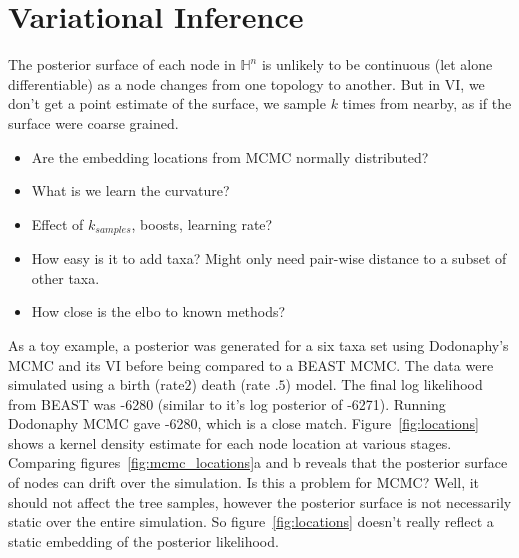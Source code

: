 \documentclass[11pt]{article}
\begin{document}
\section{Variational Inference}
The posterior surface of each node in $\mathbb{H}^{n}$ is unlikely to be continuous (let alone differentiable) as a node changes from one topology to another. But in VI, we don't get a point estimate of the surface, we sample $k$ times from nearby, as if the surface were coarse grained.

\begin{itemize}
\item Are the embedding locations from MCMC normally distributed?
\item What is we learn the curvature?
\item Effect of $k_{samples}$, boosts, learning rate?
\item How easy is it to add taxa? Might only need pair-wise distance to a subset of other taxa.
\item How close is the elbo to known methods?
\end{itemize}

As a toy example, a posterior was generated for a six taxa set using Dodonaphy's MCMC and its VI before being compared to a BEAST MCMC. The data were simulated using a birth (rate$2$) death (rate $.5$) model. The final log likelihood from BEAST was -6280 (similar to it's log posterior of -6271). Running Dodonaphy MCMC gave -6280, which is a close match. Figure~\ref{fig:locations} shows a kernel density estimate for each node location at various stages. Comparing figures~\ref{fig:mcmc_locations}a and b reveals that the posterior surface of nodes can drift over the simulation. Is this a problem for MCMC? Well, it should not affect the tree samples, however the posterior surface is not necessarily static over the entire simulation. So figure~\ref{fig:locations} doesn't really reflect a static embedding of the posterior likelihood.
\end{document}
